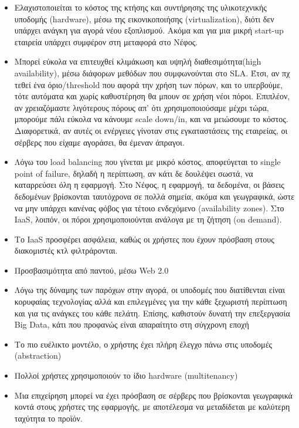 \documentclass{article}
\begin{document}
\begin{itemize}
\item Eλαχιστοποιείται το κόστος της κτήσης και συντήρησης της υλικοτεχνικής υποδομής (hardware), μέσω της εικονικοποιήσης (virtualization), διότι δεν υπάρχει ανάγκη για αγορά νέου εξοπλισμού. Ακόμα και για μια μικρή start-up εταιρεία υπάρχει συμφέρον στη μεταφορά στο Νέφος.
\item Μπορεί εύκολα να επιτευχθεί κλιμάκωση και υψηλή διαθεσιμότητα(high availability), μέσω διάφορων μεθόδων που συμφωνούνται στο SLA. Έτσι, αν πχ τεθεί ένα όριο/threshold που αφορά την χρήση των πόρων, και το υπερβούμε, τότε αυτόματα και χωρίς καθυστέρηση θα μπουν σε χρήση νέοι πόροι. Επιπλέον, αν χρειαζόμαστε λιγότερους πόρους  απ’ ότι χρησιμοποιούσαμε μέχρι τώρα, μπορούμε πάλι εύκολα να κάνουμε scale down/in, και να μειώσουμε το κόστος. Διαφορετικά, αν αυτές οι ενέργειες γίνοταν στις εγκαταστάσεις της εταιρείας, οι σέρβερς που είχαμε αγοράσει, θα έμεναν άπραγοι.
\item Λόγω του load balancing που γίνεται με μικρό κόστος, αποφεύγεται το single point of failure, δηλαδή η περίπτωση, αν κάτι δε δουλέψει σωστά, να καταρρεύσει όλη η εφαρμογή. Στο Νέφος, η εφαρμογή, τα δεδομένα, οι βάσεις δεδομένων βρίσκονται ταυτόχρονα σε πολλά σημεία, ακόμα και γεωγραφικά, ώστε να μην υπάρχει κανένας φόβος για τέτοιο ενδεχόμενο (availability zones).
Στο IaaS, λοιπόν, οι πόροι χρησιμοποιούνται ανάλογα με τη ζήτηση (on demand).
\item Το IaaS προσφέρει ασφάλεια, καθώς οι χρήστες που έχουν πρόσβαση στους διακομιστές κτλ φιλτράρονται.
\item Προσβασιμότητα από παντού, μέσω Web 2.0
\item Λόγω της δύναμης των παρόχων στην αγορά, οι υποδομές που διατίθενται είναι κορυφαίας τεχνολογίας αλλά και επιλεγμένες για την κάθε ξεχωριστή περίπτωση και για τις ανάγκες του κάθε πελάτη. Επίσης, καθιστούν δυνατή την επεξεργασία Big Data, κάτι που προφανώς είναι απαραίτητο στη σύγχρονη εποχή
\item Το πιο ευέλικτο μοντέλο, ο χρήστης έχει πλήρη έλεγχο πάνω στις υποδομές (abstraction)
\item Πολλοί χρήστες χρησιμοποιούν το ίδιο hardware (multitenancy)
\item Μια επιχείρηση μπορεί να έχει πρόσβαση σε σέρβερς που βρίσκονται γεωγραφικά κοντά στους χρήστες της εφαρμογής, με αποτέλεσμα να μεταδίδεται με καλύτερη ταχύτητα το προϊόν.
\end{itemize}
\end{document}
